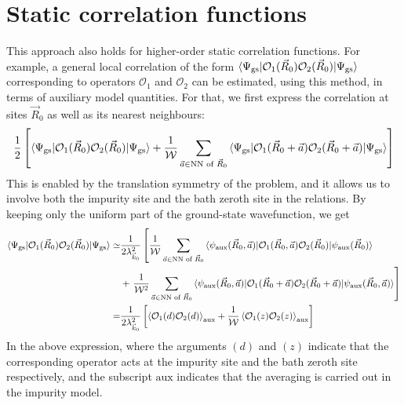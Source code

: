 \documentclass{report}
\numberwithin{equation}{section}
\begin{document}
\section{Static correlation functions}
This approach also holds for higher-order static correlation functions. For example, a general local correlation of the form \(\braket{\Psi_\text{gs} | \mathcal{O}_1(\vec R_0) \mathcal{O}_2(\vec R_0) | \Psi_\text{gs}}\) corresponding to operators \(\mathcal{O}_1\) and \(\mathcal{O}_2\) can be estimated, using this method, in terms of auxiliary model quantities. For that, we first express the correlation at sites \(\vec R_0\) as well as its nearest neighbours: 
\begin{equation}\begin{aligned}
	\frac{1}{2}\left[\braket{\Psi_\text{gs} | \mathcal{O}_1(\vec R_0) \mathcal{O}_2(\vec R_0) | \Psi_\text{gs}} + \frac{1}{\mathcal{W}}\sum_{\vec a \in \text{NN of }\vec R_0}\braket{\Psi_\text{gs} | \mathcal{O}_1(\vec R_0 + \vec a) \mathcal{O}_2(\vec R_0 + \vec a) | \Psi_\text{gs}}\right]
\end{aligned}\end{equation}
This is enabled by the translation symmetry of the problem, and it allows us to involve both the impurity site and the bath zeroth site in the relations. By keeping only the uniform part of the ground-state wavefunction, we get
\begin{equation}\begin{aligned}
	\label{local_correlation}
	\braket{\Psi_\text{gs} | \mathcal{O}_1(\vec R_0) \mathcal{O}_2(\vec R_0) | \Psi_\text{gs}} \simeq& \frac{1}{2\lambda_{\vec k_0}^2}\left[\frac{1}{\mathcal{W} }\sum_{\vec a \in \text{NN of }\vec R_0}\braket{\psi_\text{aux}(\vec R_0, \vec a) | \mathcal{O}_1(\vec R_0, \vec a) \mathcal{O}_2(\vec R_0) | \psi_\text{aux}(\vec R_0)} \right. \\
													   &+ \left.\frac{1}{\mathcal{W}^2}\sum_{\vec a \in \text{NN of }\vec R_0}\braket{\psi_\text{aux}(\vec R_0, \vec a) | \mathcal{O}_1(\vec R_0 + \vec a) \mathcal{O}_2(\vec R_0 + \vec a) | \psi_\text{aux}(\vec R_0, \vec a)}\right]\\
	=& \frac{1}{2\lambda_{\vec k_0}^2}\left[\braket{\mathcal{O}_1(d) \mathcal{O}_2(d)}_\text{aux} + \frac{1}{\mathcal{W}}\braket{\mathcal{O}_1(z) \mathcal{O}_2(z)}_\text{aux}\right]
\end{aligned}\end{equation}
In the above expression, where the arguments \((d)\) and \((z)\) indicate that the corresponding operator acts at the impurity site and the bath zeroth site respectively, and the subscript \(\text{aux}\) indicates that the averaging is carried out in the impurity model.
\end{document}
